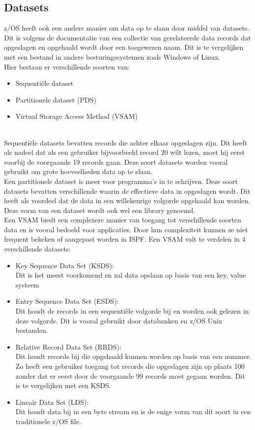 \subsection{Datasets}
z/OS heeft ook een andere manier om data op te slaan door middel van datasets. Dit is volgens de documentatie van \textcite{IBM} een collectie van gerelateerde data records dat opgeslagen en opgehaald wordt door een toegewezen naam. Dit is te vergelijken met een bestand in andere besturingssystemen zoals Windows of Linux. \\

Hier bestaan er verschillende soorten van:

\begin{itemize}
    \item Sequentiële dataset
    \item Partitionele dataset (PDS)
    \item Virtual Storage Access Method (VSAM)
\end{itemize} \\

Sequentiële datasets bevatten records die achter elkaar opgeslagen zijn. Dit heeft als nadeel dat als een gebruiker bijvoorbeeld record 20 wilt lezen, moet hij eerst voorbij de voorgaande 19 records gaan. Deze soort datasets worden vooral gebruikt om grote hoeveelheden data op te slaan. \autocite{IBM} \\

Een partitionele dataset is meer voor programma's in te schrijven. Deze soort datasets bevatten verschillende  waarin de effectieve data in opgeslagen wordt. Dit heeft als voordeel dat de data in een willekeurige volgorde opgehaald kan worden. Deze vorm van een dataset wordt ook wel een library genoemd. \autocite{IBM} \\

Een VSAM biedt een complexere manier van toegang tot verschillende soorten data en is vooral bedoeld voor applicaties. Door hun complexiteit kunnen ze niet frequent bekeken of aangepast worden in ISPF. Een VSAM valt te verdelen in 4 verschillende datasets:
\begin{itemize}
    \item Key Sequence Data Set (KSDS): \\Dit is het meest voorkomend en zal data opslaan op basis van een key, value systeem
    \item Entry Sequence Data Set (ESDS): \\Dit houdt de records in een sequentiële volgorde bij en worden ook gelezen in deze volgorde. Dit is vooral gebruikt door databanken en z/OS Unix bestanden.
    \item Relative Record Data Set (RRDS): \\Dit houdt records bij die opgehaald kunnen worden op basis van een nummer. Zo heeft een gebruiker toegang tot records die opgeslagen zijn op plaats 100 zonder dat er eerst door de voorgaande 99 records moet gegaan worden. Dit is te vergelijken met een KSDS.
    \item Lineair Data Set (LDS): \\Dit houdt data bij in een byte stream en is de enige vorm van dit soort in een traditionele z/OS file.
\end{itemize}
\autocite{IBM}
